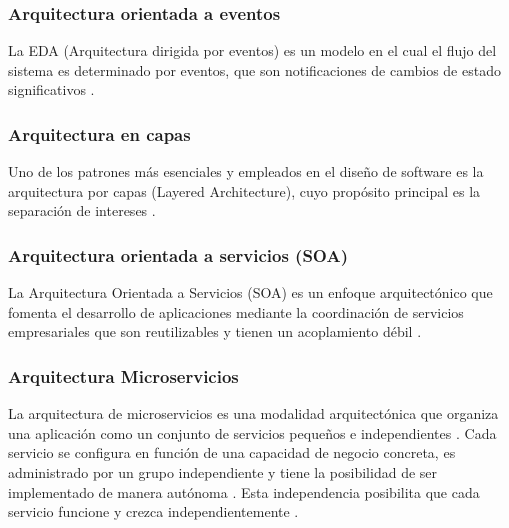 \subsubsection*{\hspace{0.7cm}Arquitectura orientada a eventos}
La EDA (Arquitectura dirigida por eventos) es un modelo en el cual el flujo del sistema es determinado por eventos, que son notificaciones de cambios de estado significativos \cite{michelson2006event}.
\subsubsection*{\hspace{0.7cm}Arquitectura en capas}
Uno de los patrones más esenciales y empleados en el diseño de software es la arquitectura por capas (Layered Architecture), cuyo propósito principal es la separación de intereses \cite{gorton2006essential}.
\subsubsection*{\hspace{0.7cm}Arquitectura orientada a servicios (SOA)}
La Arquitectura Orientada a Servicios (SOA) es un enfoque arquitectónico que fomenta el desarrollo de aplicaciones mediante la coordinación de servicios empresariales que son reutilizables y tienen un acoplamiento débil \cite{erl2016soa}.
\subsubsection*{\hspace{0.7cm}Arquitectura Microservicios}
La arquitectura de microservicios es una modalidad arquitectónica que organiza una aplicación como un conjunto de servicios pequeños e independientes \cite{newman2021building}. Cada servicio se configura en función de una capacidad de negocio concreta, es administrado por un grupo independiente y tiene la posibilidad de ser implementado de manera autónoma \cite{vural2017systematic}. Esta independencia posibilita que cada servicio funcione y crezca independientemente \cite{blinowski2022monolithic}.


